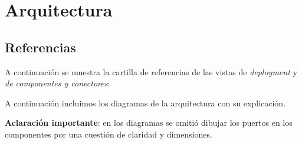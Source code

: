 \section{Arquitectura}

\subsection{Referencias}
A continuación se muestra la cartilla de referencias de las vistas de \emph{deployment} y \emph{de componentes y conectores}:
\begin{center}
\end{center}


A continuación incluimos los diagramas de la arquitectura con su explicación.

\textbf{Aclaración importante}: en los diagramas se omitió dibujar los puertos en los componentes por una cuestión de claridad y dimensiones.

\newpage


\newpage


\newpage


\newpage


\newpage


\newpage


\newpage


\newpage


\newpage


\newpage


\newpage


\newpage


\newpage


\newpage


